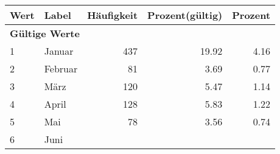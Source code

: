      \begin{longtable}{lXrrr}
     \toprule
     \textbf{Wert} & \textbf{Label} & \textbf{Häufigkeit} & \textbf{Prozent(gültig)} & \textbf{Prozent} \\
     \endhead
     \midrule
     \multicolumn{5}{l}{\textbf{Gültige Werte}}\\

     1 &
     \multicolumn{1}{X}{ Januar   } &


       \num{437} &
       \num[round-mode=places,round-precision=2]{19.92} &
         \num[round-mode=places,round-precision=2]{4.16} \\

     2 &
     \multicolumn{1}{X}{ Februar   } &


       \num{81} &
       \num[round-mode=places,round-precision=2]{3.69} &
         \num[round-mode=places,round-precision=2]{0.77} \\

     3 &
     \multicolumn{1}{X}{ März   } &


       \num{120} &
       \num[round-mode=places,round-precision=2]{5.47} &
         \num[round-mode=places,round-precision=2]{1.14} \\

     4 &
     \multicolumn{1}{X}{ April   } &


       \num{128} &
       \num[round-mode=places,round-precision=2]{5.83} &
         \num[round-mode=places,round-precision=2]{1.22} \\

     5 &
     \multicolumn{1}{X}{ Mai   } &


       \num{78} &
       \num[round-mode=places,round-precision=2]{3.56} &
         \num[round-mode=places,round-precision=2]{0.74} \\

     6 &
     \multicolumn{1}{X}{ Juni   } &



\end{longtable}
